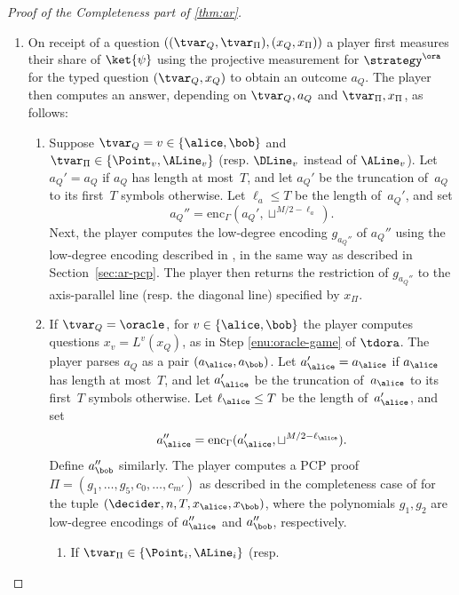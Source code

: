 \begin{proof}[Proof of the Completeness part of \cref{thm:ar}]
  \begin{enumerate}
  \item On receipt of a question $((\tvar_Q,\tvar_\Pi),(x_Q, x_\Pi))$ a player
    first measures their share of $\ket{\psi}$ using the projective measurement
    for $\strategy^\ora$ for the typed question $(\tvar_Q,x_Q)$ to obtain an
    outcome $a_Q$.
    The player then computes an answer, depending on $\tvar_Q, a_Q$ and
    $\tvar_\Pi,x_\Pi$, as follows:
    \begin{enumerate}
    \item Suppose $\tvar_Q = v \in \{\alice,\bob\}$ and $\tvar_\Pi \in
      \{\Point_v, \ALine_v \}$ (resp. $\DLine_v$ instead of $\ALine_v$).
      Let $a_Q' = a_Q$ if $a_Q$ has length at most~$T$, and let $a_Q'$ be the
      truncation of~$a_Q$ to its first~$T$ symbols otherwise.
      Let $\ell_a \leq T$ be the length of~$a_Q'$, and set 
      \begin{equation*}
      a_Q'' = \mathrm{enc}_\Gamma(a_Q', \sqcup^{M/2 - \ell_a}).
      \end{equation*}
      Next, the player computes the low-degree encoding $g_{a_Q''}$ of $a_Q''$
      using the low-degree encoding described in , in the
      same way as described in Section~\ref{sec:ar-pcp}.
      The player then returns the restriction of $g_{a_Q''}$ to the
      axis-parallel line (resp.
      the diagonal line) specified by $x_\Pi$.
\item
If $\tvar_Q=\oracle$, for $v \in \{\alice, \bob\}$ the player computes
      questions $x_v = L^{v}(x_Q)$, as in Step \ref{enu:oracle-game} of
      $\tdora$.
      The player parses $a_Q$ as a pair $(a_\alice, a_\bob)$.
      Let $a_\alice' = a_\alice$ if $a_\alice$ has length at most~$T$, and let
      $a_\alice'$ be the truncation of~$a_\alice$ to its first~$T$ symbols
      otherwise.
      Let $\ell_{\alice} \leq T$ be the length of~$a_\alice'$, and set
      \begin{equation*}
        a_\alice'' = \mathrm{enc}_\Gamma(a_\alice', \sqcup^{M/2 - \ell_{\alice}}).
      \end{equation*}
      Define $a_\bob''$ similarly.
      The player computes a PCP proof $\Pi=(g_1, \dots, g_5, c_0, \dots, c_{m'})$ as
      described in the completeness case of  for the tuple
      $(\decider, n, T, x_\alice, x_\bob)$, where the polynomials $g_1, g_2$ are
      low-degree encodings of $a_\alice''$ and $a_\bob''$, respectively.
      \begin{enumerate}
      \item If $\tvar_\Pi \in \{\Point_i, \ALine_i\}$ (resp.

\end{enumerate}
\end{enumerate}
\end{enumerate}
\end{proof}
